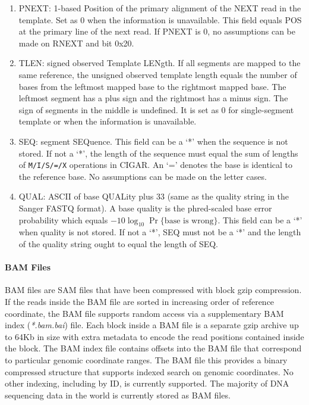\begin{enumerate}
    \item {\sf PNEXT}: 1-based Position of the primary alignment of the NEXT read in the template. Set as
      0 when the information is unavailable. This field equals {\sf POS} at the primary line of
      the next read. If {\sf PNEXT} is 0, no assumptions can be made on
      {\sf RNEXT} and bit 0x20.
    \item {\sf TLEN}: signed observed Template LENgth. If all segments are
      mapped to the same reference, the unsigned observed template length
      equals the number of bases from the leftmost mapped base to the
      rightmost mapped base. The leftmost segment has a plus sign and the
      rightmost has a minus sign. The sign of segments in the middle is
      undefined. It is set as 0 for single-segment template or when the
      information is unavailable.
    \item {\sf SEQ}: segment SEQuence. This field can be a `*' when the
      sequence is not stored. If not a `*', the length of the sequence must
      equal the sum of lengths of {\tt M/I/S/=/X} operations in {\sf CIGAR}.
      An `=' denotes the base is identical to the reference base. No
      assumptions can be made on the letter cases.
    \item {\sf QUAL}: ASCII of base QUALity plus 33 (same as the quality
      string in the Sanger FASTQ format). A base quality is the phred-scaled
      base error probability which equals $-10\log_{10}\Pr\{\mbox{base is
        wrong}\}$. This field can be a `*' when quality is not stored. If
      not a `*', {\sf SEQ} must not be a `*' and the length of the quality string
      ought to equal the length of {\sf SEQ}.
    \end{enumerate}
\paragraph{BAM Files}

BAM files are SAM files that have been compressed with block gzip compression\autocite{li2011tabix}. If the reads inside the BAM file are sorted in increasing order of reference coordinate, the BAM file supports random access via a supplementary BAM index (\emph{*.bam.bai}) file. Each block inside a BAM file is a separate gzip archive up to 64Kb in size with extra metadata to encode the read positions contained inside the block. The BAM index file contains offsets into the BAM file that correspond to particular genomic coordinate ranges. The BAM file this provides a binary compressed structure that supports indexed search on genomic coordinates. No other indexing, including by ID, is currently supported. The majority of DNA sequencing data in the world is currently stored as BAM files.

